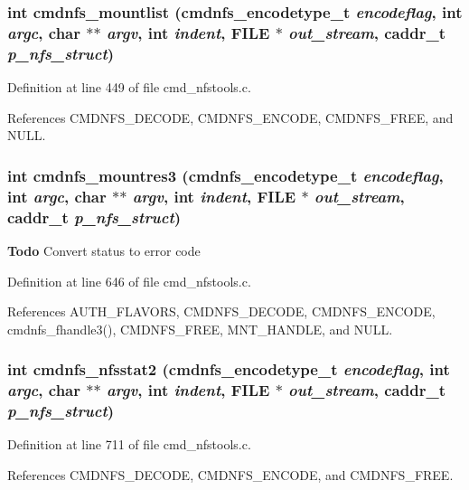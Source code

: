 \subsubsection{\setlength{\rightskip}{0pt plus 5cm}int cmdnfs\_\-mountlist ({\bf cmdnfs\_\-encodetype\_\-t} {\em encodeflag}, int {\em argc}, char $\ast$$\ast$ {\em argv}, int {\em indent}, FILE $\ast$ {\em out\_\-stream}, caddr\_\-t {\em p\_\-nfs\_\-struct})}\label{cmd__nfstools_8h_a19}




Definition at line 449 of file cmd\_\-nfstools.c.

References CMDNFS\_\-DECODE, CMDNFS\_\-ENCODE, CMDNFS\_\-FREE, and NULL.
\subsubsection{\setlength{\rightskip}{0pt plus 5cm}int cmdnfs\_\-mountres3 ({\bf cmdnfs\_\-encodetype\_\-t} {\em encodeflag}, int {\em argc}, char $\ast$$\ast$ {\em argv}, int {\em indent}, FILE $\ast$ {\em out\_\-stream}, caddr\_\-t {\em p\_\-nfs\_\-struct})}\label{cmd__nfstools_8h_a21}


\begin{Desc}
\item[{\bf Todo}]Convert status to error code\end{Desc}


Definition at line 646 of file cmd\_\-nfstools.c.

References AUTH\_\-FLAVORS, CMDNFS\_\-DECODE, CMDNFS\_\-ENCODE, cmdnfs\_\-fhandle3(), CMDNFS\_\-FREE, MNT\_\-HANDLE, and NULL.
\subsubsection{\setlength{\rightskip}{0pt plus 5cm}int cmdnfs\_\-nfsstat2 ({\bf cmdnfs\_\-encodetype\_\-t} {\em encodeflag}, int {\em argc}, char $\ast$$\ast$ {\em argv}, int {\em indent}, FILE $\ast$ {\em out\_\-stream}, caddr\_\-t {\em p\_\-nfs\_\-struct})}\label{cmd__nfstools_8h_a27}




Definition at line 711 of file cmd\_\-nfstools.c.

References CMDNFS\_\-DECODE, CMDNFS\_\-ENCODE, and CMDNFS\_\-FREE.


